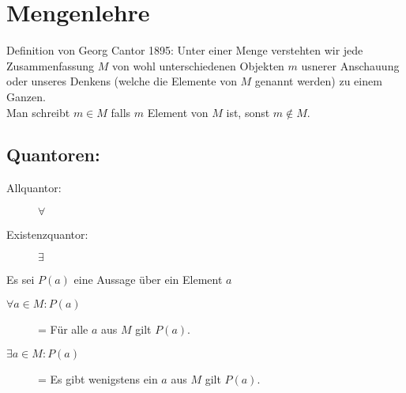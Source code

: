 \section{Mengenlehre}
Definition von Georg Cantor 1895: \glqq Unter einer \glqq Menge \grqq verstehten wir jede Zusammenfassung $M$ von wohl unterschiedenen Objekten $m$ usnerer Anschauung oder unseres Denkens (welche die \glqq Elemente \grqq von $M$ genannt werden) zu einem Ganzen.\grqq\\

Man schreibt $m \in M$ falls $m$ Element von $M$ ist, sonst $m \notin M$. 
\subsection{Quantoren:}
\begin{description}
\item[Allquantor: ] $\forall$
\item[Existenzquantor: ] $\exists$
\end{description}
Es sei $P(a)$ eine Aussage über ein Element $a$
\begin{description}
\item[$\forall a \in M : P(a)$] = Für alle $a$ aus $M$ gilt $P(a)$. 
\item[$\exists a \in M : P(a)$] = Es gibt wenigstens ein $a$ aus $M$ gilt $P(a)$.
\end{description}
